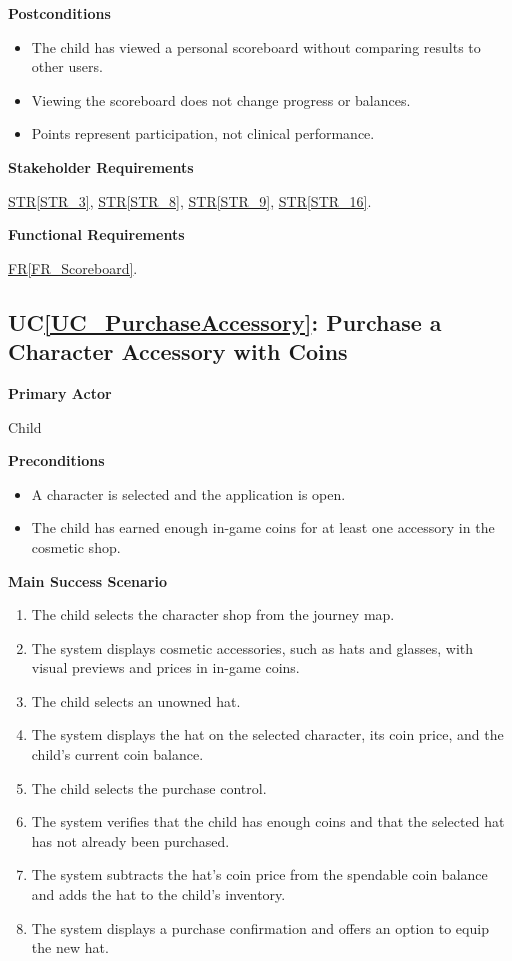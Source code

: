 \documentclass[10pt]{article}
\newcommand{\strref}[1]{\hyperref[#1]{STR\ref*{#1}}}
\newcounter{ucnum} %
\newcommand{\ucheading}[1]{UC\ref*{#1}}
\newcommand{\rref}[1]{\hyperref[#1]{FR\ref*{#1}}}
\begin{document}
\textbf{Postconditions}
\begin{itemize}
    \item The child has viewed a personal scoreboard without
    comparing results to other users.
    \item Viewing the scoreboard does not change progress or balances.
    \item Points represent participation, not clinical performance.
\end{itemize}

\textbf{Stakeholder Requirements}

\strref{STR_3}, \strref{STR_8}, \strref{STR_9}, \strref{STR_16}.

\textbf{Functional Requirements}

\rref{FR_Scoreboard}.

\label{UC_PurchaseAccessory}
\subsection{\ucheading{UC_PurchaseAccessory}: Purchase a Character Accessory with Coins}

\textbf{Primary Actor}

Child

\textbf{Preconditions}
\begin{itemize}
    \item A character is selected and the application is open.
    \item The child has earned enough in-game coins for at least
    one accessory in the cosmetic shop.
\end{itemize}

\textbf{Main Success Scenario}
\begin{enumerate}
    \item The child selects the character shop from the journey map.
    \item The system displays cosmetic accessories, such as hats
    and glasses, with visual previews and prices in in-game coins.
    \item The child selects an unowned hat.
    \item The system displays the hat on the selected character,
    its coin price, and the child's current coin balance.
    \item The child selects the purchase control.
    \item The system verifies that the child has enough coins and
    that the selected hat has not already been purchased.
    \item The system subtracts the hat's coin price from the
    spendable coin balance and adds the hat to the child's inventory.
    \item The system displays a purchase confirmation and offers
    an option to equip the new hat.
\end{enumerate}
\end{document}
